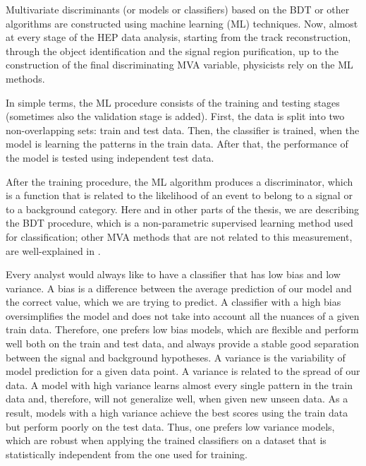 \begin{small}
Multivariate discriminants (or models or classifiers) based on the BDT or other algorithms are constructed using machine learning (ML) techniques. Now, almost at every stage of the HEP data analysis, starting from the track reconstruction, through the object identification and the signal region purification, up to the construction of the final discriminating MVA variable, physicists rely on the ML methods.
           
In simple terms, the ML procedure consists of the training and testing stages (sometimes also the validation stage is added). First, the data is split into two non-overlapping sets: train and test data. Then, the classifier is trained, when the model is learning the patterns in the train data. After that, the performance of the model is tested using independent test data. 

After the training procedure, the ML algorithm produces a discriminator, which is a function that is related to the likelihood of an event to belong to a signal or to a background category. Here and in other parts of the thesis, we are describing the BDT procedure, which is a non-parametric supervised learning method used for classification; other MVA methods that are not related to this measurement, are well-explained in \cite{book:411471}. 

Every analyst would always like to have a classifier that has low bias and low variance. A bias is a difference between the average prediction of our model and the correct value, which we are trying to predict. A classifier with a high bias oversimplifies the model and does not take into account all the nuances of a given train data. Therefore, one prefers low bias models, which are flexible and perform well both on the train and test data, and always provide a stable good separation between the signal and background hypotheses. A variance is the variability of model prediction for a given data point. A variance is related to the spread of our data. A model with high variance learns almost every single pattern in the train data and, therefore, will not generalize well, when given new unseen data. As a result, models with a high variance achieve the best scores using the train data but perform poorly on the test data. Thus, one prefers low variance models, which are robust when applying the trained classifiers on a dataset that is statistically independent from the one used for training.


\end{small}
